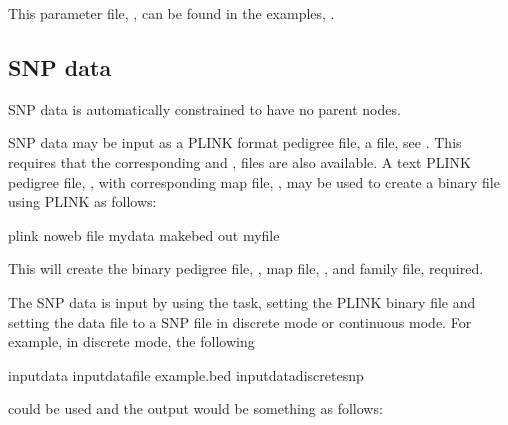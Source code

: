 \documentclass[letterpaper,10pt,english]{sphinxmanual}
\begin{document}
\sphinxAtStartPar
This parameter file, , can be found in the examples, .


\subsection{SNP data}
\label{\detokenize{input-data:snp-data}}\label{\detokenize{input-data:input-data-snp}}
\sphinxAtStartPar
SNP data is automatically constrained to have no parent nodes.

\sphinxAtStartPar
SNP data may be input as a  PLINK format pedigree file, a  file, see  .
This requires that the corresponding  and , files are also available. A text PLINK pedigree file, , with corresponding map file, , may be used to create a binary file using PLINK as follows:

\begin{sphinxVerbatim}[commandchars=\\\{\}]
plink \PYGZhy{}\PYGZhy{}noweb \PYGZhy{}\PYGZhy{}file mydata \PYGZhy{}\PYGZhy{}make\PYGZhy{}bed \PYGZhy{}\PYGZhy{}out myfile
\end{sphinxVerbatim}

\sphinxAtStartPar
This will create the binary pedigree file, , map file, , and family file,  required.

\sphinxAtStartPar
The SNP data is input by using the  task, setting the PLINK binary file and setting the data file to a SNP file in discrete mode or continuous mode. For example, in discrete mode, the following

\begin{sphinxVerbatim}[commandchars=\\\{\}]
\PYGZhy{}input\PYGZhy{}data
\PYGZhy{}input\PYGZhy{}data\PYGZhy{}file example.bed
\PYGZhy{}input\PYGZhy{}data\PYGZhy{}discrete\PYGZhy{}snp
\end{sphinxVerbatim}

\sphinxAtStartPar
could be used and the output would be something as follows:
\end{document}
